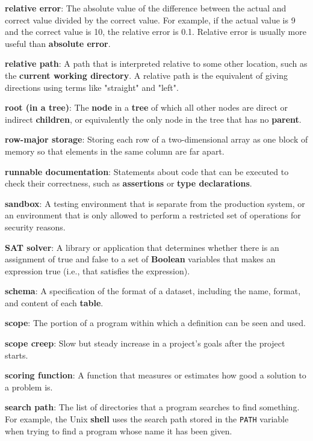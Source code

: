 \documentclass[krantzl]{krantz}
\newcommand{\glosskey}[1]{\textbf{#1}}
\begin{document}
\noindent \textbf{\glosskey{relative error}}: 
The absolute value of the difference between the actual and correct value divided by the correct value. For example, if the actual value is 9 and the correct value is 10, the relative error is 0.1. Relative error is usually more useful than \glosskey{absolute error}.


\noindent \textbf{\glosskey{relative path}}: 
A path that is interpreted relative to some other location, such as the \glosskey{current working directory}. A relative path is the equivalent of giving directions using terms like "straight" and "left".


\noindent \textbf{\glosskey{root (in a tree)}}: 
The \glosskey{node} in a \glosskey{tree} of which all other nodes are direct or indirect \glosskey{children}, or equivalently the only node in the tree that has no \glosskey{parent}.


\noindent \textbf{\glosskey{row-major storage}}: 
Storing each row of a two-dimensional array as one block of memory so that elements in the same column are far apart.


\noindent \textbf{\glosskey{runnable documentation}}: 
Statements about code that can be executed to check their correctness, such as \glosskey{assertions} or \glosskey{type declarations}.


\noindent \textbf{\glosskey{sandbox}}: 
A testing environment that is separate from the production system, or an environment that is only allowed to perform a restricted set of operations for security reasons.


\noindent \textbf{\glosskey{SAT solver}}: 
A library or application that determines whether there is an assignment of true and false to a set of \glosskey{Boolean} variables that makes an expression true (i.e., that satisfies the expression).


\noindent \textbf{\glosskey{schema}}: 
A specification of the format of a dataset, including the name, format, and content of each \glosskey{table}.


\noindent \textbf{\glosskey{scope}}: 
The portion of a program within which a definition can be seen and used.


\noindent \textbf{\glosskey{scope creep}}: 
Slow but steady increase in a project's goals after the project starts.


\noindent \textbf{\glosskey{scoring function}}: 
A function that measures or estimates how good a solution to a problem is.


\noindent \textbf{\glosskey{search path}}: 
The list of directories that a program searches to find something. For example, the Unix \glosskey{shell} uses the search path stored in the \texttt{PATH} variable when trying to find a program whose name it has been given.
\end{document}
